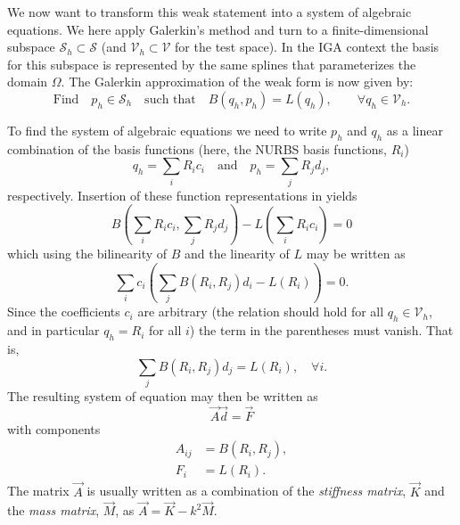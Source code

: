 We now want to transform this weak statement into a system of algebraic equations. We here apply Galerkin's method and turn to a finite-dimensional subspace $\mathcal{S}_h\subset \mathcal{S}$ (and $\mathcal{V}_h\subset \mathcal{V}$ for the test space). In the IGA context the basis for this subspace is represented by the same splines that parameterizes the domain $\Omega$. The Galerkin approximation of the weak form is now given by:
\begin{equation}\label{Eq:weakformulationHelmholtz_h}
	\text{Find} \quad p_h\in \mathcal{S}_h\quad\text{such that}\quad B(q_h,p_h) = L(q_h),\qquad \forall q_h\in \mathcal{V}_h.
\end{equation}

To find the system of algebraic equations we need to write $p_h$ and $q_h$ as a linear combination of the basis functions (here, the NURBS basis functions, $R_i$)
\begin{equation*}
	q_h = \sum_i R_i c_i\quad\text{and}\quad p_h = \sum_j R_j d_j,
\end{equation*}
respectively. Insertion of these function representations in  yields
\begin{equation*}
	B\left(\sum_i R_i c_i, \sum_j R_j d_j\right) - L\left(\sum_i R_i c_i\right) = 0
\end{equation*}
which using the bilinearity of $B$ and the linearity of $L$ may be written as
\begin{equation*}
	\sum_i c_i\left(\sum_j B\left(R_i, R_j\right)d_i - L(R_i)\right) = 0.
\end{equation*}
Since the coefficients $c_i$ are arbitrary (the relation should hold for all $q_h\in \mathcal{V}_h$, and in particular $q_h=R_i$ for all $i$) the term in the parentheses must vanish. That is,
\begin{equation*}
	\sum_j B(R_i, R_j)d_j = L(R_i),\quad\forall i.
\end{equation*}
The resulting system of equation may then be written as
\begin{equation*}
	\vec{A}\vec{d}=\vec{F}
\end{equation*}
with components
\begin{align*}
	A_{ij} &= B(R_i, R_j),\\
	F_i &= L(R_i).
\end{align*}
The matrix $\vec{A}$ is usually written as a combination of the \textit{stiffness matrix}, $\vec{K}$ and the \textit{mass matrix}, $\vec{M}$, as $\vec{A} = \vec{K}-k^2\vec{M}$.


